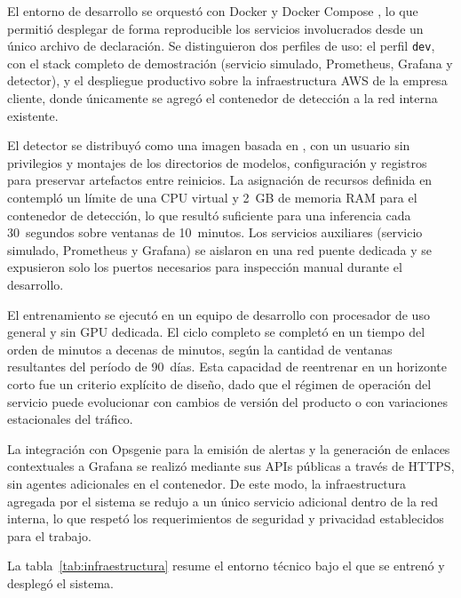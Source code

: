 El entorno de desarrollo se orquestó con Docker y Docker Compose \citep{merkel2014docker}, lo que permitió desplegar de forma reproducible los servicios involucrados desde un único archivo de declaración. Se distinguieron dos perfiles de uso: el perfil \texttt{dev}, con el stack completo de demostración (servicio simulado, Prometheus, Grafana y detector), y el despliegue productivo sobre la infraestructura AWS de la empresa cliente, donde únicamente se agregó el contenedor de detección a la red interna existente.

El detector se distribuyó como una imagen basada en , con un usuario sin privilegios y montajes de los directorios de modelos, configuración y registros para preservar artefactos entre reinicios. La asignación de recursos definida en  contempló un límite de una CPU virtual y 2~GB de memoria RAM para el contenedor de detección, lo que resultó suficiente para una inferencia cada 30~segundos sobre ventanas de 10~minutos. Los servicios auxiliares (servicio simulado, Prometheus y Grafana) se aislaron en una red puente dedicada y se expusieron solo los puertos necesarios para inspección manual durante el desarrollo.

El entrenamiento se ejecutó en un equipo de desarrollo con procesador de uso general y sin GPU dedicada. El ciclo completo se completó en un tiempo del orden de minutos a decenas de minutos, según la cantidad de ventanas resultantes del período de 90~días. Esta capacidad de reentrenar en un horizonte corto fue un criterio explícito de diseño, dado que el régimen de operación del servicio puede evolucionar con cambios de versión del producto o con variaciones estacionales del tráfico.

La integración con Opsgenie para la emisión de alertas y la generación de enlaces contextuales a Grafana se realizó mediante sus APIs públicas a través de HTTPS, sin agentes adicionales en el contenedor. De este modo, la infraestructura agregada por el sistema se redujo a un único servicio adicional dentro de la red interna, lo que respetó los requerimientos de seguridad y privacidad establecidos para el trabajo.

La tabla~\ref{tab:infraestructura} resume el entorno técnico bajo el que se entrenó y desplegó el sistema.

